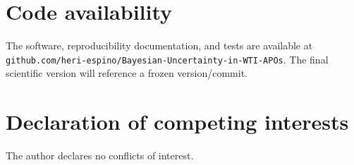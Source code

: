 \documentclass[a4paper,fleqn]{cas-dc}
\begin{document}
\section*{Code availability}
The software, reproducibility documentation, and tests are available at
\texttt{github.com/heri-espino/Bayesian-Uncertainty-in-WTI-APOs}. The final
scientific version will reference a frozen version/commit.

\section*{Declaration of competing interests}
The author declares no conflicts of interest.



\end{document}
